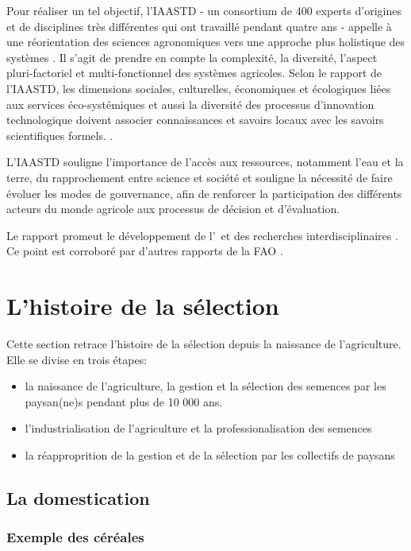 Pour réaliser un tel objectif, l'IAASTD - un consortium de 400 experts d'origines et de disciplines très différentes qui ont travaillé pendant quatre ans - appelle à une réorientation des sciences agronomiques vers une approche plus holistique des systèmes \cite{iaastd_agriculture_2008,even_liaastd_2009}.
Il s'agit de prendre en compte la complexité, la diversité, l'aspect pluri-factoriel et multi-fonctionnel des systèmes agricoles.
Selon le rapport de l'IAASTD, les dimensions sociales, culturelles, économiques et écologiques liées aux services éco-systémiques et aussi la diversité des processus d’innovation technologique doivent associer connaissances et savoirs locaux avec les savoirs scientifiques formels. \cite{iaastd_agriculture_2008,fao_report_2010,mea_ecosystems_2005}.

L'IAASTD souligne l'importance de l'accès aux ressources, notamment l'eau et la terre, du rapprochement entre science et société et souligne la nécessité de faire évoluer les modes de gouvernance, afin de renforcer la participation des différents acteurs du monde agricole aux processus de décision et d’évaluation.

Le rapport promeut le développement de l'\agec~et des recherches interdisciplinaires \cite{even_liaastd_2009}.
Ce point est corroboré par d'autres rapports de la FAO \cite{fao_international_2007,fao_biodiversity_2010}.


\section{L'histoire de la sélection}
Cette section retrace l'histoire de la sélection depuis la naissance de l'agriculture.
Elle se divise en trois étapes:
\begin{itemize}
\item la naissance de l'agriculture, la gestion et la sélection des semences par les paysan(ne)s pendant plus de 10 000 ans.
\item l'industrialisation de l'agriculture et la professionalisation des semences
\item la réapproprition de la gestion et de la sélection par les collectifs de paysans
\end{itemize}

\subsection{La domestication}

\subsubsection{Exemple des céréales}

